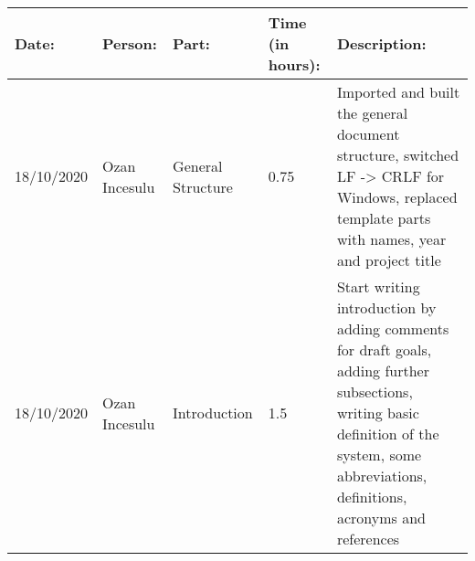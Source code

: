 
\begin{table}[h]
    \begin{tabular}{|p{2cm}|p{2cm}|p{2cm}|p{1.5cm}|p{8cm}|}
        \hline
        Date:      & Person:       & Part:             & Time (in hours): & Description:                                       \\ \hline
        18/10/2020 & Ozan Incesulu & General Structure & 0.75             & Imported and built the general document structure, switched LF -> CRLF for Windows, replaced template parts with names, year and project title \\ \hline
        18/10/2020 & Ozan Incesulu & Introduction      & 1.5              & Start writing introduction by adding comments for draft goals, adding further subsections, writing basic definition of the system, some abbreviations, definitions, acronyms and references \\ \hline
    \end{tabular}
\end{table}
